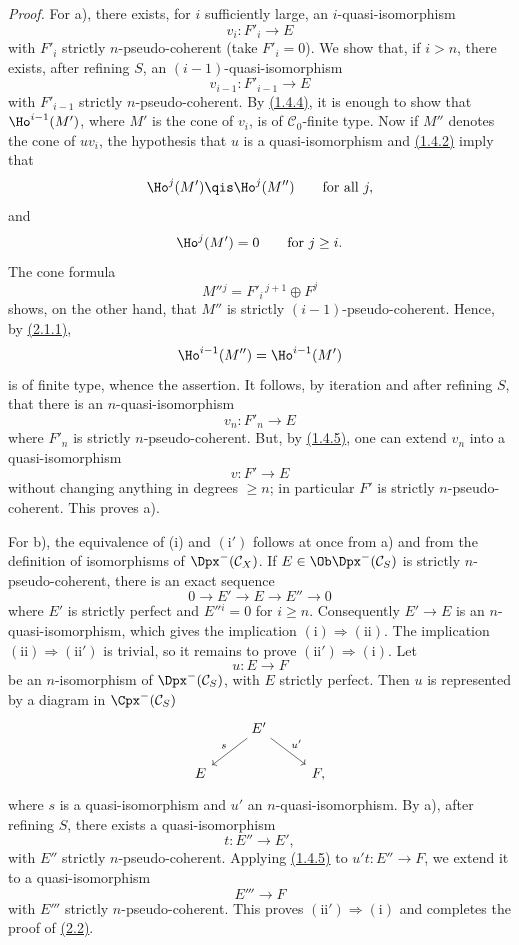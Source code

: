 \emph{Proof.} For a), there exists, for \(i\) sufficiently large, an \(i\)-quasi-isomorphism
\[
  v_i:F'_i\longrightarrow E
\]
with \(F'_i\) strictly \(n\)-pseudo-coherent (take \(F'_i=0\)). We show that, if \(i>n\), there exists, after refining \(S\), an \((i-1)\)-quasi-isomorphism
\[
  v_{i-1}:F'_{i-1}\longrightarrow E
\]
with \(F'_{i-1}\) strictly \(n\)-pseudo-coherent. By \hyperlink{sga6.e01.cor.1-4-4}{(1.4.4)}, it is enough to show that \(\Ho^{i-1}(M')\), where \(M'\) is the cone of \(v_i\), is of \(\mathcal C_0\)-finite type. Now if \(M''\) denotes the cone of \(uv_i\), the hypothesis that \(u\) is a quasi-isomorphism and \hyperlink{sga6.e01.lem.1-4-2}{(1.4.2)} imply that
\[
  \Ho^j(M')\qis \Ho^j(M'')\qquad\text{for all }j,
\]
and
\[
  \Ho^j(M')=0\qquad\text{for }j\geq i.
\]
The cone formula
\[
  M''{}^j=F'_i{}^{\,j+1}\oplus F^j
\]
shows, on the other hand, that \(M''\) is strictly \((i-1)\)-pseudo-coherent. Hence, by \hyperlink{sga6.e01.lem.2-1-1}{(2.1.1)},
\[
  \Ho^{i-1}(M'')=\Ho^{i-1}(M')
\]
is of finite type, whence the assertion. It follows, by iteration and after refining \(S\), that there is an \(n\)-quasi-isomorphism
\[
  v_n:F'_n\longrightarrow E
\]
where \(F'_n\) is strictly \(n\)-pseudo-coherent. But, by \hyperlink{sga6.e01.cor.1-4-5}{(1.4.5)}, one can extend \(v_n\) into a quasi-isomorphism
\[
  v:F'\longrightarrow E
\]
without changing anything in degrees \(\geq n\); in particular \(F'\) is strictly \(n\)-pseudo-coherent. This proves a).

For b), the equivalence of (i) and \((\mathrm{i}')\) follows at once from a) and from the definition of isomorphisms of \(\Dpx^-(\mathcal C_X)\). If \(E\in\Ob\Dpx^-(\mathcal C_S)\) is strictly \(n\)-pseudo-coherent, there is an exact sequence
\[
  0\longrightarrow E'\longrightarrow E\longrightarrow E''\longrightarrow 0
\]
where \(E'\) is strictly perfect and \(E''{}^i=0\) for \(i\geq n\). Consequently \(E'\to E\) is an \(n\)-quasi-isomorphism, which gives the implication \((\mathrm{i})\Rightarrow(\mathrm{ii})\). The implication \((\mathrm{ii})\Rightarrow(\mathrm{ii}')\) is trivial, so it remains to prove \((\mathrm{ii}')\Rightarrow(\mathrm{i})\). Let
\[
  u:E\longrightarrow F
\]
be an \(n\)-isomorphism of \(\Dpx^-(\mathcal C_S)\), with \(E\) strictly perfect. Then \(u\) is represented by a diagram in \(\Cpx^-(\mathcal C_S)\)
\[
\begin{tikzcd}
& E' \arrow[dl,"s"'] \arrow[dr,"u'"]\\
E && F ,
\end{tikzcd}
\]
where \(s\) is a quasi-isomorphism and \(u'\) an \(n\)-quasi-isomorphism. By a), after refining \(S\), there exists a quasi-isomorphism
\[
  t:E''\longrightarrow E',
\]
with \(E''\) strictly \(n\)-pseudo-coherent. Applying \hyperlink{sga6.e01.cor.1-4-5}{(1.4.5)} to \(u't:E''\to F\), we extend it to a quasi-isomorphism
\[
  E'''\longrightarrow F
\]
with \(E'''\) strictly \(n\)-pseudo-coherent. This proves \((\mathrm{ii}')\Rightarrow(\mathrm{i})\) and completes the proof of \hyperlink{sga6.e01.prop.2-2}{(2.2)}.

